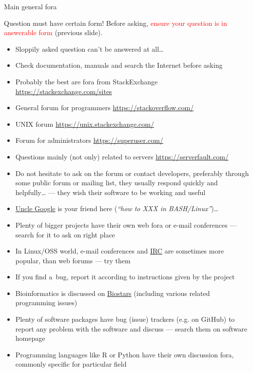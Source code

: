 \documentclass[compress, ucs, xelatex, 11pt, xcolor=svgnames, aspectratio=169,
	hyperref={
		bookmarks=true,
		unicode=true,
		colorlinks=true,
		pdftitle={Linux, command line and MetaCentrum},
		plainpages=false,
		pdfauthor={Vojtech Zeisek},
		pdfsubject={Course about use of Linux command line, writing shell scripts and using MetaCentrum of CESNET},
		pdfcreator={XeLaTeX},
		pdfkeywords={Linux, GNU, BASH, shell, command line, MetaCentrum},
		linkcolor=DarkRed, %
		anchorcolor=DarkBlue, %
		citecolor=Indigo, %
		filecolor=NavyBlue, %
		menucolor=DarkMagenta, %
		urlcolor=DarkBlue, %
		pdftex},
	url={hyphens, lowtilde} %
	]{beamer}
\renewcommand{\alert}[1]{\textcolor{red}{#1}}
\begin{document}
\begin{frame}[allowframebreaks]{Main general fora}
	\begin{block}{Question must have certain form!}
			Before asking, \alert{ensure your question is in answerable form} (previous slide).
		\begin{itemize}
			\item Sloppily asked question can't be answered at all\ldots
			\item Check documentation, manuals and search the Internet before asking
		\end{itemize}
	\end{block}
	\begin{itemize}
		\item Probably the best are fora from StackExchange \url{https://stackexchange.com/sites}
		\item General forum for programmers \url{https://stackoverflow.com/}
		\item UNIX forum \url{https://unix.stackexchange.com/}
		\item Forum for administrators \url{https://superuser.com/}
		\item Questions mainly (not only) related to servers \url{https://serverfault.com/}
		\item Do not hesitate to ask on the forum or contact developers, preferably through some public forum or mailing list, they usually respond quickly and helpfully\ldots{ }--- they wish their software to be working and useful
		\item \href{https://www.startpage.com/}{Uncle Google} is your friend here (\textit{\enquote{how to XXX in BASH/Linux}})\ldots
		\item Plenty of bigger projects have their own web fora or e-mail conferences --- search for it to ask on right place
		\item In Linux/OSS world, e-mail conferences and \href{https://en.wikipedia.org/wiki/Internet_Relay_Chat}{IRC} are sometimes more popular, than web forums --- try them
		\item If you find a~bug, report it according to instructions given by the project
		\item Bioinformatics is discussed on \href{https://www.biostars.org/}{Biostars} (including various related programming issues)
		\item Plenty of software packages have bug (issue) trackers (e.g. on GitHub) to report any problem with the software and discuss --- search them on software homepage
		\item Programming languages like R or Python have their own discussion fora, commonly specific for particular field
	\end{itemize}
\end{frame}
\end{document}
